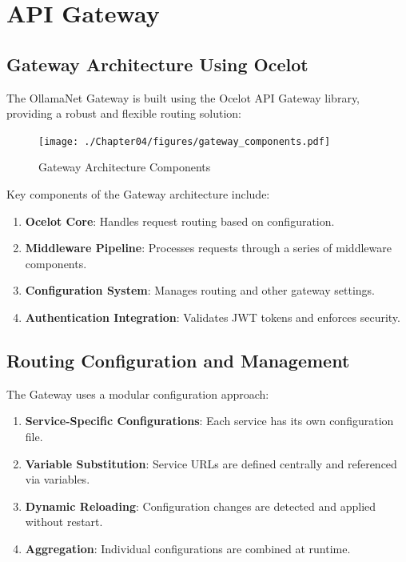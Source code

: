\section{API Gateway}

\subsection{Gateway Architecture Using Ocelot}

The OllamaNet Gateway is built using the Ocelot API Gateway library, providing a robust and flexible routing solution:

\begin{figure}[p]
    \centering
    \texttt{[image: ./Chapter04/figures/gateway\_components.pdf]}
    \caption{Gateway Architecture Components}
    \label{fig:gateway-components}
\end{figure}
\clearpage

Key components of the Gateway architecture include:

\begin{enumerate}
   \item \textbf{Ocelot Core}: Handles request routing based on configuration.
   \item \textbf{Middleware Pipeline}: Processes requests through a series of middleware components.
   \item \textbf{Configuration System}: Manages routing and other gateway settings.
   \item \textbf{Authentication Integration}: Validates JWT tokens and enforces security.
\end{enumerate}

\subsection{Routing Configuration and Management}

The Gateway uses a modular configuration approach:

\begin{enumerate}
   \item \textbf{Service-Specific Configurations}: Each service has its own configuration file.
   \item \textbf{Variable Substitution}: Service URLs are defined centrally and referenced via variables.
   \item \textbf{Dynamic Reloading}: Configuration changes are detected and applied without restart.
   \item \textbf{Aggregation}: Individual configurations are combined at runtime.
\end{enumerate}

